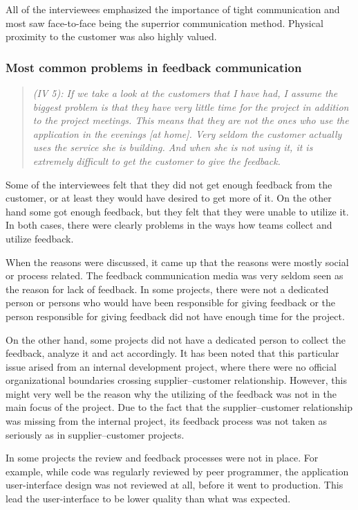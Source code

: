 \documentclass[english,12pt,a4paper,pdftex]{article}
\newcommand{\q}[2]{
\begin{quote}
\emph{(IV #1): #2}
\end{quote}}
\begin{document}
All of the interviewees emphasized the importance of tight communication and most saw face-to-face being the superrior communication method. Physical proximity to the customer was also highly valued.

\subsubsection{Most common problems in feedback communication}

\q{5}{If we take a look at the customers that I have had, I assume the biggest problem is that they have very little time for the project in addition to the project meetings. This means that they are not the ones who use the application in the evenings [at home]. Very seldom the customer actually uses the service she is building. And when she is not using it, it is extremely difficult to get the customer to give the feedback.}

Some of the interviewees felt that they did not get enough feedback from the customer, or at least they would have desired to get more of it. On the other hand some got enough feedback, but they felt that they were unable to utilize it. In both cases, there were clearly problems in the ways how teams collect and utilize feedback.

When the reasons were discussed, it came up that the reasons were mostly social or process related. The feedback communication media was very seldom seen as the reason for lack of feedback. In some projects, there were not a dedicated person or persons who would have been responsible for giving feedback or the person responsible for giving feedback did not have enough time for the project. 

On the other hand, some projects did not have a dedicated person to collect the feedback, analyze it and act accordingly. It has been noted that this particular issue arised from an internal development project, where there were no official organizational boundaries crossing supplier--customer relationship. However, this might very well be the reason why the utilizing of the feedback was not in the main focus of the project. Due to the fact that the supplier--customer relationship was missing from the internal project, its feedback process was not taken as seriously as in supplier--customer projects.

In some projects the review and feedback processes were not in place. For example, while code was regularly reviewed by peer programmer, the application user-interface design was not reviewed at all, before it went to production. This lead the user-interface to be lower quality than what was expected.
\end{document}
